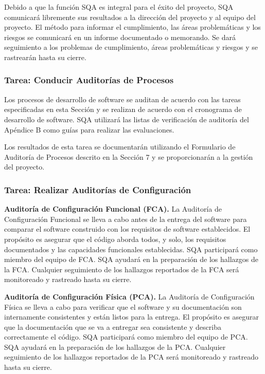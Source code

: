 Debido a que la función SQA es integral para el éxito del proyecto, SQA comunicará libremente sus resultados a la dirección del proyecto y al equipo del proyecto. El método para informar el cumplimiento, las áreas problemáticas y los riesgos se comunicará en un informe documentado o memorando. Se dará seguimiento a los problemas de cumplimiento, áreas problemáticas y riesgos y se rastrearán hasta su cierre.

\subsubsection{ Tarea: Conducir Auditorías de Procesos}
Los procesos de desarrollo de software se auditan de acuerdo con las tareas especificadas en esta Sección y se realizan de acuerdo con el cronograma de desarrollo de software. SQA utilizará las listas de verificación de auditoría del Apéndice B como guías para realizar las evaluaciones.

Los resultados de esta tarea se documentarán utilizando el Formulario de Auditoría de Procesos descrito en la Sección 7 y se proporcionarán a la gestión del proyecto.

\subsubsection{ Tarea: Realizar Auditorías de Configuración}
\textbf{Auditoría de Configuración Funcional (FCA).} La Auditoría de Configuración Funcional se lleva a cabo antes de la entrega del software para comparar el software construido con los requisitos de software establecidos. El propósito es asegurar que el código aborda todos, y solo, los requisitos documentados y las capacidades funcionales establecidas. SQA participará como miembro del equipo de FCA. SQA ayudará en la preparación de los hallazgos de la FCA. Cualquier seguimiento de los hallazgos reportados de la FCA será monitoreado y rastreado hasta su cierre.

\textbf{Auditoría de Configuración Física (PCA).} La Auditoría de Configuración Física se lleva a cabo para verificar que el software y su documentación son internamente consistentes y están listos para la entrega. El propósito es asegurar que la documentación que se va a entregar sea consistente y describa correctamente el código. SQA participará como miembro del equipo de PCA. SQA ayudará en la preparación de los hallazgos de la PCA. Cualquier seguimiento de los hallazgos reportados de la PCA será monitoreado y rastreado hasta su cierre.

